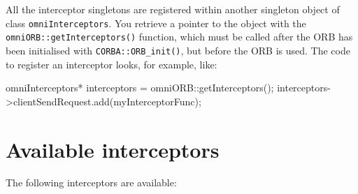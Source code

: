 \documentclass[11pt,oneside,a4paper]{book}
\newcommand{\code}[1]{\texttt{#1}}
\newcommand{\op}[1]{\texttt{#1()}}
\newcommand{\dsc}{\discretionary{}{}{}}
\begin{document}
All the interceptor singletons are registered within another singleton
object of class \code{omniInterceptors}. You retrieve a pointer to the
object with the \op{omniORB::\dsc{}getInterceptors} function, which
must be called after the ORB has been initialised with
\op{CORBA::ORB\_init}, but before the ORB is used. The code to
register an interceptor looks, for example, like:

\begin{cxxlisting}
omniInterceptors* interceptors = omniORB::getInterceptors();
interceptors->clientSendRequest.add(myInterceptorFunc);
\end{cxxlisting}


\section{Available interceptors}

The following interceptors are available:
\end{document}
